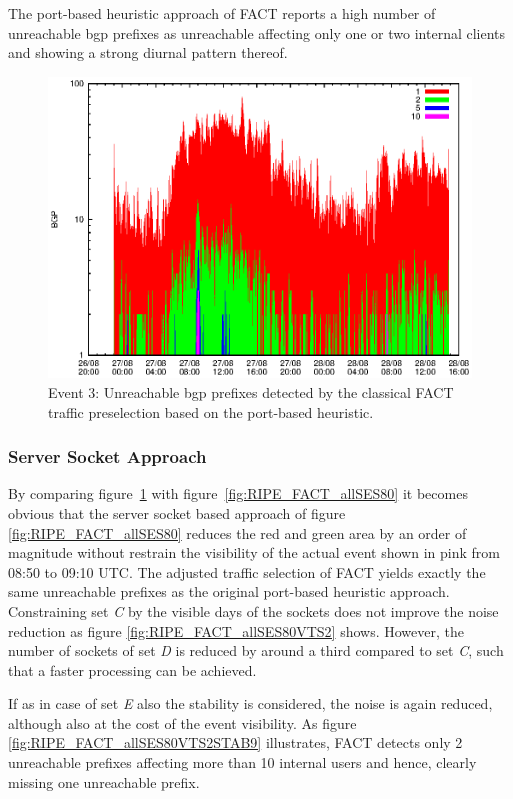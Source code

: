 The port-based heuristic approach of \gls{FACT} reports a high number of unreachable \gls{bgp} prefixes as unreachable affecting only one or two internal clients and showing a strong diurnal pattern thereof. 
\begin{figure}
	[p] \centering 
	\includegraphics[width=0.75\linewidth]{images/events/2010_08_27/bgp_log_port80_ref.eps} \caption{Event 3: Unreachable \gls{bgp} prefixes detected by the classical \gls{FACT} traffic preselection based on the port-based heuristic.} 
	\label{fig:RIPE_FACT_REF} 
\end{figure}

\subsubsection{Server Socket Approach} 

By comparing figure \ref{fig:RIPE_FACT_REF} with figure \ref{fig:RIPE_FACT_allSES80} it becomes obvious that the \gls{server socket} based approach of figure \ref{fig:RIPE_FACT_allSES80} reduces the red and green area by an order of magnitude without restrain the visibility of the actual event shown in pink from 08:50 to 09:10 UTC. 
The adjusted traffic selection of \gls{FACT} yields exactly the same unreachable prefixes as the original port-based heuristic approach. 
Constraining set \emph{C} by the visible days of the sockets does not improve the noise reduction as figure \ref{fig:RIPE_FACT_allSES80VTS2} shows. 
However, the number of sockets of set \emph{D} is reduced by around a third compared to set \emph{C}, such that a faster processing can be achieved.

If as in case of set \emph{E} also the stability is considered, the noise is again reduced, although also at the cost of the event visibility. 
As figure \ref{fig:RIPE_FACT_allSES80VTS2STAB9} illustrates, \gls{FACT} detects only 2 unreachable prefixes affecting more than 10 internal users and hence, clearly missing one unreachable prefix. 

